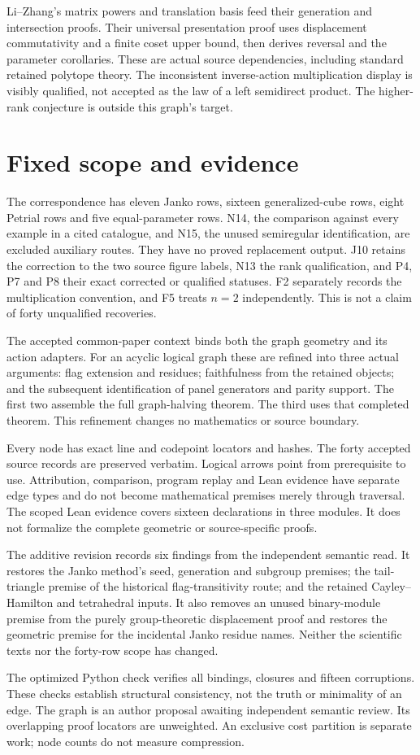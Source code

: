 \documentclass[a4paper,11pt]{article}
\begin{document}
Li--Zhang's matrix powers and translation basis feed their generation and
intersection proofs. Their universal presentation proof uses displacement
commutativity and a finite coset upper bound, then derives reversal and the
parameter corollaries. These are actual source dependencies, including standard
retained polytope theory. The inconsistent inverse-action multiplication display
is visibly qualified, not accepted as the law of a left semidirect product.
The higher-rank conjecture is outside this graph's target.

\section{Fixed scope and evidence}
The correspondence has eleven Janko rows, sixteen generalized-cube rows, eight
Petrial rows and five equal-parameter rows. N14, the comparison against every
example in a cited catalogue, and N15, the unused semiregular identification,
are excluded auxiliary routes. They have no proved replacement output. J10
retains the correction to the two source figure labels, N13 the rank qualification,
and P4, P7 and P8 their exact corrected or qualified statuses. F2 separately
records the multiplication convention, and F5 treats $n=2$ independently.
This is not a claim of forty unqualified recoveries.

The accepted common-paper context binds both the graph geometry and its action
adapters. For an acyclic logical graph these are refined into three actual
arguments: flag extension and residues; faithfulness from the retained objects;
and the subsequent identification of panel generators and parity support.
The first two assemble the full graph-halving theorem. The third uses that
completed theorem. This refinement changes no mathematics or source boundary.

Every node has exact line and codepoint locators and hashes. The forty accepted
source records are preserved verbatim. Logical arrows point from prerequisite
to use. Attribution, comparison, program replay and Lean evidence have separate
edge types and do not become mathematical premises merely through traversal.
The scoped Lean evidence covers sixteen declarations in three modules. It does
not formalize the complete geometric or source-specific proofs.

The additive revision records six findings from the independent semantic read.
It restores the Janko method's seed, generation and subgroup premises; the
tail-triangle premise of the historical flag-transitivity route; and the
retained Cayley--Hamilton and tetrahedral inputs. It also removes an unused
binary-module premise from the purely group-theoretic displacement proof and
restores the geometric premise for the incidental Janko residue names.
Neither the scientific texts nor the forty-row scope has changed.

The optimized Python check verifies all bindings, closures and fifteen corruptions.
These checks establish structural consistency, not the truth or minimality of an
edge. The graph is an author proposal awaiting independent semantic review.
Its overlapping proof locators are unweighted. An exclusive cost partition
is separate work; node counts do not measure compression.
\end{document}

